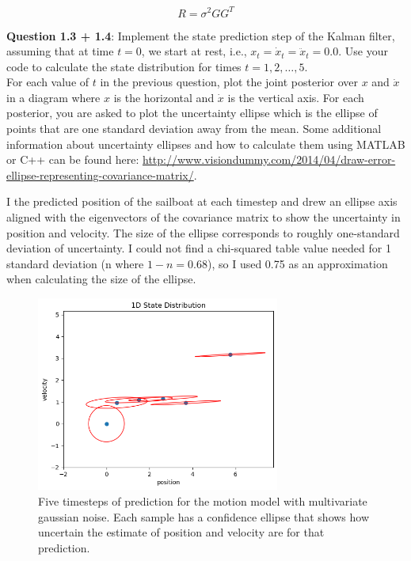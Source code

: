 \documentclass{article}
\begin{document}
\begin{equation}\label{R_calc}
    R = \sigma^2 G G^T
\end{equation}

{\bf Question 1.3 + 1.4}: Implement the state prediction step of the Kalman filter, assuming that at time $t = 0$, we start at rest, i.e., $x_t = \dot{x}_t = \ddot{x}_t = 0.0$. Use your code to calculate the state distribution for times $t = 1, 2, \ldots, 5$.\\
For each value of $t$ in the previous question, plot the joint posterior over $x$ and $\dot{x}$ in a diagram where $x$ is the horizontal and $\dot{x}$ is the vertical axis. For each posterior, you are asked to plot the uncertainty ellipse which is the ellipse of points that are one standard deviation away from the mean. Some additional information about uncertainty ellipses and how to calculate them using MATLAB or C++ can be found here: \url{http://www.visiondummy.com/2014/04/draw-error-ellipse-representing-covariance-matrix/}.

I the predicted position of the sailboat at each timestep and drew an ellipse axis aligned with the eigenvectors of the covariance matrix to show the uncertainty in position and velocity. The size of the ellipse corresponds to roughly one-standard deviation of uncertainty. I could not find a chi-squared table value needed for 1 standard deviation (n where $1-n = 0.68$), so I used 0.75 as an approximation when calculating the size of the ellipse.

\begin{figure}[h]
    \includegraphics[width=8cm]{conf_ellipses.png}
    \centering
    \caption{Five timesteps of prediction for the motion model with multivariate gaussian noise. Each sample has a confidence ellipse that shows how uncertain the estimate of position and velocity are for that prediction.}
\end{figure}
\end{document}
